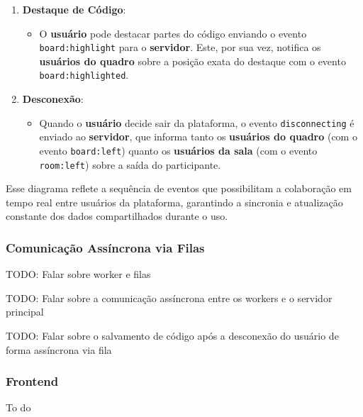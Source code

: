 \begin{enumerate}
    \item \textbf{Destaque de Código}:
    \begin{itemize}
        \item O \textbf{usuário} pode destacar partes do código enviando o evento \texttt{board:highlight} para o \textbf{servidor}. Este, por sua vez, notifica os \textbf{usuários do quadro} sobre a posição exata do destaque com o evento \texttt{board:highlighted}.
    \end{itemize}

    \item \textbf{Desconexão}:
    \begin{itemize}
        \item Quando o \textbf{usuário} decide sair da plataforma, o evento \texttt{disconnecting} é enviado ao \textbf{servidor}, que informa tanto os \textbf{usuários do quadro} (com o evento \texttt{board:left}) quanto os \textbf{usuários da sala} (com o evento \texttt{room:left}) sobre a saída do participante.
    \end{itemize}
\end{enumerate}

Esse diagrama reflete a sequência de eventos que possibilitam a colaboração em tempo real entre usuários da plataforma, garantindo a sincronia e atualização constante dos dados compartilhados durante o uso.


\subsubsection{Comunicação Assíncrona via Filas}

TODO: Falar sobre worker e filas

TODO: Falar sobre a comunicação assíncrona entre os workers e o servidor principal

TODO: Falar sobre o salvamento de código após a desconexão do usuário de forma assíncrona via fila




\subsubsection{Frontend}

To do


